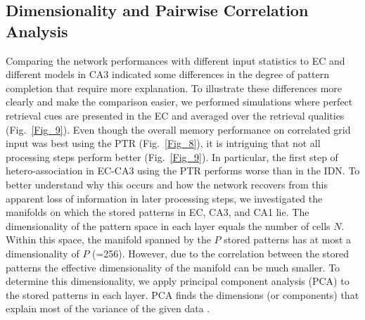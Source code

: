 \documentclass[utf8]{frontiersSCNS} %
\begin{document}
\subsection{Dimensionality and Pairwise Correlation Analysis}

Comparing the network performances with different input statistics to EC and different models in CA3 indicated some differences in the degree of pattern completion that require more explanation. To illustrate these differences more clearly and make the comparison easier, we performed simulations where perfect retrieval cues are presented in the EC and averaged over the retrieval qualities (Fig.~\ref{Fig_9}).  
%
Even though the overall memory performance on correlated grid input was best using the PTR (Fig.~\ref{Fig_8}), it is intriguing that not all processing steps perform better (Fig.~\ref{Fig_9}). In particular, the first step of hetero-association in EC-CA3 using the PTR performs worse than in the IDN.
%
To better understand why this occurs and how the network recovers from this apparent loss of information in later processing steps, we investigated the manifolds on which the stored patterns in EC, CA3, and CA1 lie. The dimensionality of the pattern space in each layer equals the number of cells $N$. Within this space, the manifold spanned by the $P$ stored patterns has at most a dimensionality of $P$ (=256). However, due to the correlation between the stored patterns the effective dimensionality of the manifold can be much smaller. To determine this dimensionality, we apply principal component analysis (PCA) to the stored patterns in each layer. PCA finds the dimensions (or components) that explain most of the variance of the given data \cite[chapter 4]{Hastie2009}. 
\end{document}
